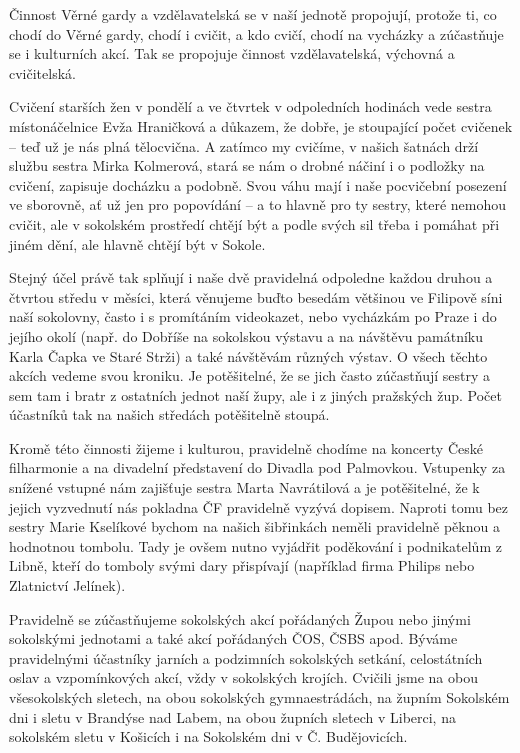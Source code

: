 Činnost Věrné gardy a vzdělavatelská se v naší jednotě propojují,
protože ti, co chodí do Věrné gardy, chodí i cvičit, a kdo cvičí, chodí
na vycházky a zúčastňuje se i kulturních akcí. Tak se propojuje činnost
vzdělavatelská, výchovná a cvičitelská.

Cvičení starších žen v pondělí a ve čtvrtek v odpoledních hodinách vede
sestra místonáčelnice Evža Hraničková a důkazem, že dobře, je stoupající
počet cvičenek -- teď už je nás plná tělocvična. A zatímco my cvičíme, v
našich šatnách drží službu sestra Mirka Kolmerová, stará se nám o drobné
náčiní i o podložky na cvičení, zapisuje docházku a podobně. Svou váhu
mají i naše pocvičební posezení ve sborovně, ať už jen pro popovídání --
a to hlavně pro ty sestry, které nemohou cvičit, ale v sokolském
prostředí chtějí být a podle svých sil třeba i pomáhat při jiném dění,
ale hlavně chtějí být v Sokole.

Stejný účel právě tak splňují i naše dvě pravidelná odpoledne každou
druhou a čtvrtou středu v měsíci, která věnujeme buďto besedám většinou
ve Filipově síni naší sokolovny, často i s promítáním videokazet, nebo
vycházkám po Praze i do jejího okolí (např. do Dobříše na sokolskou
výstavu a na návštěvu památníku Karla Čapka ve Staré Strži) a také
návštěvám různých výstav. O všech těchto akcích vedeme svou kroniku. Je
potěšitelné, že se jich často zúčastňují sestry a sem tam i bratr z
ostatních jednot naší župy, ale i z jiných pražských žup. Počet
účastníků tak na našich středách potěšitelně stoupá.

Kromě této činnosti žijeme i kulturou, pravidelně chodíme na koncerty
České filharmonie a na divadelní představení do Divadla pod Palmovkou.
Vstupenky za snížené vstupné nám zajišťuje sestra Marta Navrátilová a je
potěšitelné, že k jejich vyzvednutí nás pokladna ČF pravidelně vyzývá
dopisem. Naproti tomu bez sestry Marie Kselíkové bychom na našich
šibřinkách neměli pravidelně pěknou a hodnotnou tombolu. Tady je ovšem
nutno vyjádřit poděkování i podnikatelům z Libně, kteří do tomboly svými
dary přispívají (například firma Philips nebo Zlatnictví Jelínek).

Pravidelně se zúčastňujeme sokolských akcí pořádaných Župou nebo jinými
sokolskými jednotami a také akcí pořádaných ČOS, ČSBS apod. Býváme
pravidelnými účastníky jarních a podzimních sokolských setkání,
celostátních oslav a vzpomínkových akcí, vždy v sokolských krojích.
Cvičili jsme na obou všesokolských sletech, na obou sokolských
gymnaestrádách, na župním Sokolském dni i sletu v Brandýse nad Labem, na
obou župních sletech v Liberci, na sokolském sletu v Košicích i na
Sokolském dni v Č. Budějovicích.

